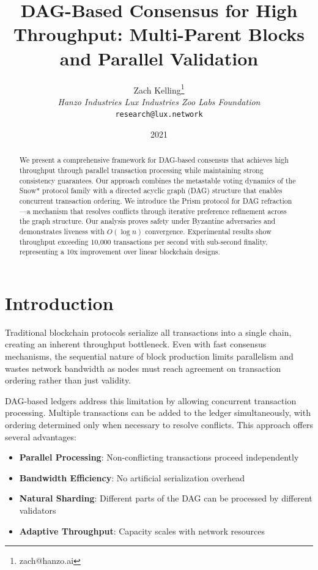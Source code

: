 \documentclass[11pt,a4paper]{article}
\title{DAG-Based Consensus for High Throughput: Multi-Parent Blocks and Parallel Validation}
\author{Zach Kelling\thanks{zach@hanzo.ai} \\ \textit{Hanzo Industries \quad Lux Industries \quad Zoo Labs Foundation} \\ \texttt{research@lux.network}}
\date{2021}
\begin{document}
\maketitle

\begin{abstract}
We present a comprehensive framework for DAG-based consensus that achieves high throughput through parallel transaction processing while maintaining strong consistency guarantees. Our approach combines the metastable voting dynamics of the Snow* protocol family with a directed acyclic graph (DAG) structure that enables concurrent transaction ordering. We introduce the Prism protocol for DAG refraction---a mechanism that resolves conflicts through iterative preference refinement across the graph structure. Our analysis proves safety under Byzantine adversaries and demonstrates liveness with $O(\log n)$ convergence. Experimental results show throughput exceeding 10,000 transactions per second with sub-second finality, representing a 10x improvement over linear blockchain designs.
\end{abstract}

\section{Introduction}

Traditional blockchain protocols serialize all transactions into a single chain, creating an inherent throughput bottleneck. Even with fast consensus mechanisms, the sequential nature of block production limits parallelism and wastes network bandwidth as nodes must reach agreement on transaction ordering rather than just validity.

DAG-based ledgers address this limitation by allowing concurrent transaction processing. Multiple transactions can be added to the ledger simultaneously, with ordering determined only when necessary to resolve conflicts. This approach offers several advantages:

\begin{itemize}
    \item \textbf{Parallel Processing}: Non-conflicting transactions proceed independently
    \item \textbf{Bandwidth Efficiency}: No artificial serialization overhead
    \item \textbf{Natural Sharding}: Different parts of the DAG can be processed by different validators
    \item \textbf{Adaptive Throughput}: Capacity scales with network resources
\end{itemize}
\end{document}

